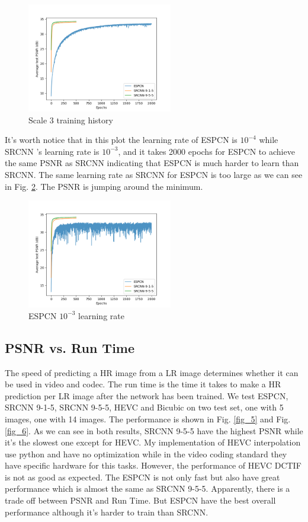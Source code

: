 \documentclass[12pt,journal,compsoc]{IEEEtran}
\begin{document}
\begin{figure}[!t] 
\centering
\includegraphics[width=2.5in]{history-sc3.png}
\caption{Scale 3 training history}
\label{fig_3}
\end{figure}

It's worth notice that in this plot the learning rate of ESPCN is $10^{-4}$ while SRCNN 's learning rate is $10^{-3}$, and it takes 2000 epochs for ESPCN to achieve the same PSNR as SRCNN indicating that ESPCN is much harder to learn than SRCNN. The same learning rate as SRCNN for ESPCN is too large as we can see in Fig. \ref{fig_4}. The PSNR is jumping around the minimum.

\begin{figure}[!t] 
\centering
\includegraphics[width=2.5in]{history-sc3_largerrate.png}
\caption{ESPCN $10^{-3}$ learning rate}
\label{fig_4}
\end{figure}

\subsection{PSNR vs. Run Time}
The speed of predicting a HR image from a LR image determines whether it can be used in video and codec. The run time is the time it takes to make a HR prediction per LR image after the network has been trained. We test ESPCN, SRCNN 9-1-5, SRCNN 9-5-5, HEVC and Bicubic on two test set, one with 5 images, one with 14 images. The performance is shown in Fig. \ref{fig_5} and Fig. \ref{fig_6}.
As we can see in both results, SRCNN 9-5-5 have the highest PSNR while it's the slowest one except for HEVC. My implementation of HEVC interpolation use python and have no optimization while in the video coding standard they have specific hardware for this tasks. However, the performance of HEVC DCTIF is not as good as expected. The ESPCN is not only fast but also have great performance which is almost the same as SRCNN 9-5-5.
Apparently, there is a trade off between PSNR and Run Time. But ESPCN have the best overall performance although it's harder to train than SRCNN.
\end{document}
